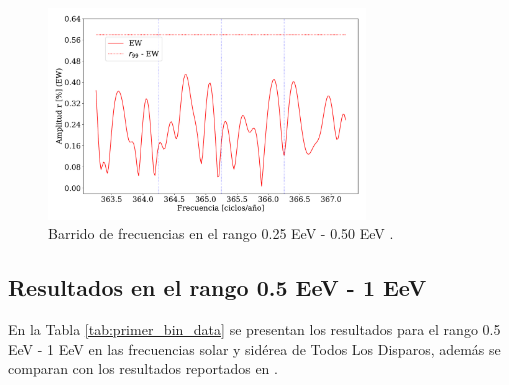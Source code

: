 \begin{figure}[H]
    \begin{small}
        \begin{center}
            \includegraphics[width=0.75\textwidth]{plot_bin_1_barrido_v3_EW.pdf}
        \end{center}
        \caption{Barrido de frecuencias en el  rango 0.25 EeV - 0.50 EeV .}
        \label{fig:primer_barrido}
    \end{small}
\end{figure}

\subsection{Resultados en el rango 0.5 EeV - 1 EeV}
En la Tabla \ref{tab:primer_bin_data} se presentan los resultados para el rango 0.5 EeV - 1 EeV en las frecuencias solar y sidérea de Todos Los Disparos, además se comparan con los resultados reportados en \cite{Aab_2020}.


